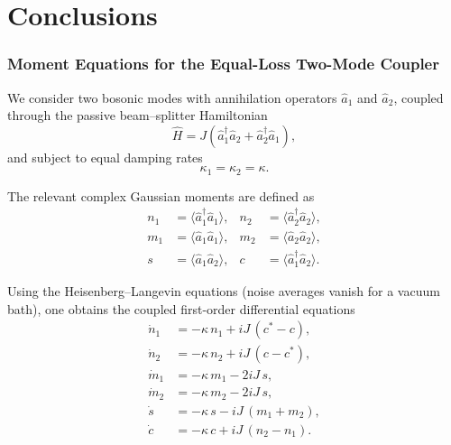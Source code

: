 
\chapter{Conclusions}
\label{ch:conclusions}

\subsection*{Moment Equations for the Equal-Loss Two-Mode Coupler}

We consider two bosonic modes with annihilation operators 
$\hat a_{1}$ and $\hat a_{2}$, coupled through the passive
beam–splitter Hamiltonian
\[
\hat H = J(\hat a_{1}^{\dagger}\hat a_{2} 
+ \hat a_{2}^{\dagger}\hat a_{1}),
\]
and subject to equal damping rates 
\[
\kappa_{1}=\kappa_{2}=\kappa.
\]

The relevant complex Gaussian moments are defined as
\[
\begin{aligned}
	n_{1} &= \langle \hat a_{1}^{\dagger}\hat a_{1}\rangle , &
	n_{2} &= \langle \hat a_{2}^{\dagger}\hat a_{2}\rangle ,\\[4pt]
	m_{1} &= \langle \hat a_{1}\hat a_{1}\rangle , &
	m_{2} &= \langle \hat a_{2}\hat a_{2}\rangle ,\\[4pt]
	s     &= \langle \hat a_{1}\hat a_{2}\rangle , &
	c     &= \langle \hat a_{1}^{\dagger}\hat a_{2}\rangle .
\end{aligned}
\]

Using the Heisenberg--Langevin equations (noise averages vanish for a
vacuum bath), one obtains the coupled first-order differential equations
\[
\boxed{
	\begin{aligned}
		\dot n_{1} &= -\kappa\, n_{1} 
		+ iJ\,(c^{*}-c),\\[4pt]
		\dot n_{2} &= -\kappa\, n_{2} 
		+ iJ\,(c-c^{*}),\\[8pt]
		\dot m_{1} &= -\kappa\, m_{1} 
		- 2iJ\, s,\\[4pt]
		\dot m_{2} &= -\kappa\, m_{2} 
		- 2iJ\, s,\\[8pt]
		\dot s     &= -\kappa\, s 
		- iJ\,(m_{1}+m_{2}),\\[4pt]
		\dot c     &= -\kappa\, c 
		+ iJ\,(n_{2}-n_{1}).
\end{aligned}}
\]

